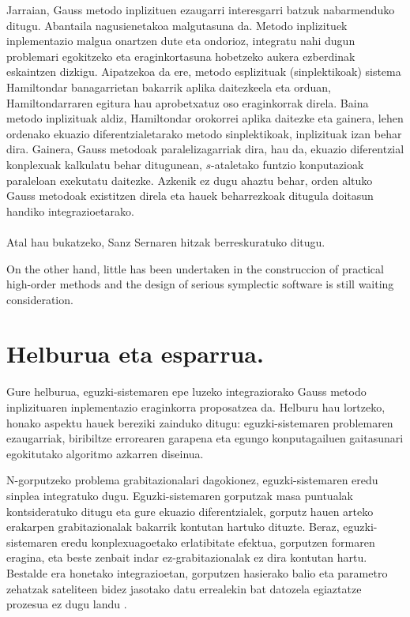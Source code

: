 Jarraian, Gauss metodo inplizituen ezaugarri interesgarri batzuk nabarmenduko ditugu. Abantaila nagusienetakoa malgutasuna da.  Metodo inplizituek inplementazio malgua onartzen dute eta ondorioz, integratu nahi dugun problemari egokitzeko eta eraginkortasuna hobetzeko aukera ezberdinak eskaintzen dizkigu. Aipatzekoa da ere, metodo esplizituak (sinplektikoak) sistema Hamiltondar banagarrietan bakarrik aplika daitezkeela eta orduan, Hamiltondarraren egitura hau aprobetxatuz oso eraginkorrak direla. Baina metodo inplizituak aldiz, Hamiltondar orokorrei aplika daitezke eta gainera, lehen ordenako ekuazio diferentzialetarako  metodo sinplektikoak, inplizituak izan behar dira. Gainera, Gauss metodoak paralelizagarriak dira, hau da, ekuazio diferentzial konplexuak kalkulatu behar ditugunean, $s$-ataletako funtzio konputazioak paraleloan exekutatu daitezke. Azkenik ez dugu ahaztu behar, orden altuko Gauss metodoak existitzen direla  eta hauek beharrezkoak ditugula doitasun handiko integrazioetarako.     

\paragraph*{}Atal hau bukatzeko, Sanz Sernaren   hitzak berreskuratuko ditugu. 
\begin{displayquote}
On the other hand, little has been undertaken in the construccion of practical high-order methods and the design of serious symplectic software is still waiting consideration.
\end{displayquote}

\section{Helburua eta esparrua.}

Gure helburua, eguzki-sistemaren epe luzeko integraziorako Gauss metodo inplizituaren inplementazio eraginkorra proposatzea da. Helburu hau lortzeko, honako aspektu hauek bereziki zainduko ditugu: eguzki-sistemaren problemaren ezaugarriak, biribiltze errorearen garapena eta egungo konputagailuen gaitasunari egokitutako algoritmo azkarren diseinua.  

N-gorputzeko problema grabitazionalari dagokionez, eguzki-sistemaren eredu sinplea integratuko dugu. Eguzki-sistemaren gorputzak masa puntualak kontsideratuko ditugu eta gure ekuazio diferentzialek, gorputz hauen arteko erakarpen grabitazionalak bakarrik kontutan hartuko dituzte. Beraz, eguzki-sistemaren eredu konplexuagoetako erlatibitate efektua, gorputzen formaren eragina, eta beste zenbait indar ez-grabitazionalak ez dira kontutan hartu.
Bestalde era honetako integrazioetan, gorputzen hasierako balio eta parametro zehatzak sateliteen bidez jasotako datu errealekin bat datozela egiaztatze prozesua ez dugu landu \cite{Laskar2015}.

